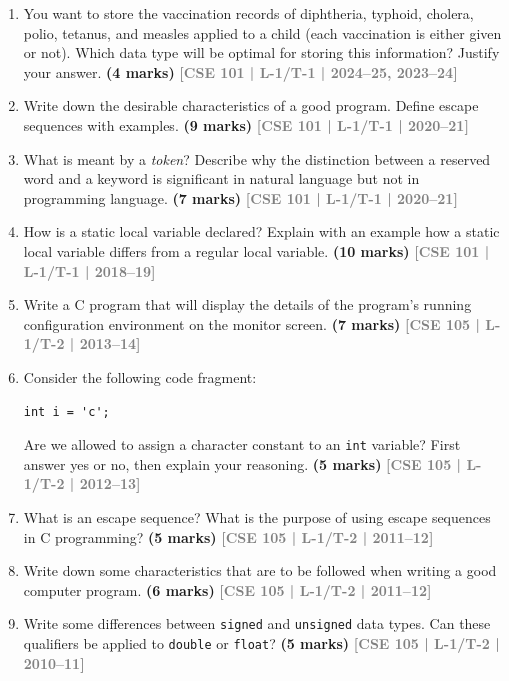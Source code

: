 \documentclass[12pt,a3paper]{article}
\newcommand{\yr}[1]{\hfill\textcolor{gray}{\small\textbf{[#1]}}}
\newcommand{\mk}[1]{\textcolor{orange!70!black}{\small\textbf{(#1 marks)}}}
\begin{document}
\begin{enumerate}

\item You want to store the vaccination records of diphtheria, typhoid, cholera, polio, tetanus, and measles applied to a child (each vaccination is either given or not). Which data type will be optimal for storing this information? Justify your answer.
\mk{4} \yr{CSE 101 | L-1/T-1 | 2024--25, 2023--24}

\item Write down the desirable characteristics of a good program. Define escape sequences with examples.
\mk{9} \yr{CSE 101 | L-1/T-1 | 2020--21}

\item What is meant by a \textit{token}? Describe why the distinction between a reserved word and a keyword is significant in natural language but not in programming language.
\mk{7} \yr{CSE 101 | L-1/T-1 | 2020--21}

\item How is a static local variable declared? Explain with an example how a static local variable differs from a regular local variable.
\mk{10} \yr{CSE 101 | L-1/T-1 | 2018--19}

\item Write a C program that will display the details of the program's running configuration environment on the monitor screen.
\mk{7} \yr{CSE 105 | L-1/T-2 | 2013--14}

\item Consider the following code fragment:
 
\begin{lstlisting}
int i = 'c';
\end{lstlisting}
Are we allowed to assign a character constant to an \texttt{int} variable? First answer yes or no, then explain your reasoning.
\mk{5} \yr{CSE 105 | L-1/T-2 | 2012--13}

\item What is an escape sequence? What is the purpose of using escape sequences in C programming?
\mk{5} \yr{CSE 105 | L-1/T-2 | 2011--12}

\item Write down some characteristics that are to be followed when writing a good computer program.
\mk{6} \yr{CSE 105 | L-1/T-2 | 2011--12}

\item Write some differences between \texttt{signed} and \texttt{unsigned} data types. Can these qualifiers be applied to \texttt{double} or \texttt{float}?
\mk{5} \yr{CSE 105 | L-1/T-2 | 2010--11}


\end{enumerate}
\end{document}

